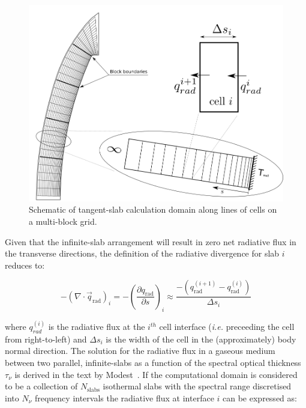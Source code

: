 \begin{figure}[h]
 \center
 \includegraphics[scale=0.85]{radiation/figures/FireII-TS.png}
 \caption{Schematic of tangent-slab calculation domain along lines of cells on a multi-block grid.}
 \label{fig:FireII-TS}
\end{figure} 

Given that the infinite-slab arrangement will result in zero net radiative flux in the transverse directions, the definition of the radiative divergence for slab $i$ reduces to:

\begin{equation}
 - \left( \nabla \cdot \vec{q}_\text{rad} \right )_{i} = - \left ( \frac{\partial q_\text{rad}}{\partial s} \right )_{i} \approx \frac{ - \left ( q_\text{rad}^{(i+1)} - q_\text{rad}^{(i)} \right ) }{ \Delta s_{i} }
 \label{eq:divq_TS}
\end{equation}

\noindent where $q_{rad}^{(i)}$ is the radiative flux at the $i^{th}$ cell interface (\textit{i.e.} preceeding the cell from right-to-left) and $\Delta s_{i}$ is the width of the cell in the (approximately) body normal direction.
The solution for the radiative flux in a gaseous medium between two parallel, infinite-slabs as a function of the spectral optical thickness $\tau_{\nu}$ is derived in the text by Modest~\cite{Mod03}.
If the computational domain is considered to be a collection of $N_\text{slabs}$ isothermal slabs with the spectral range discretised into $N_\nu$ frequency intervals the radiative flux at interface $i$ can be expressed as:

